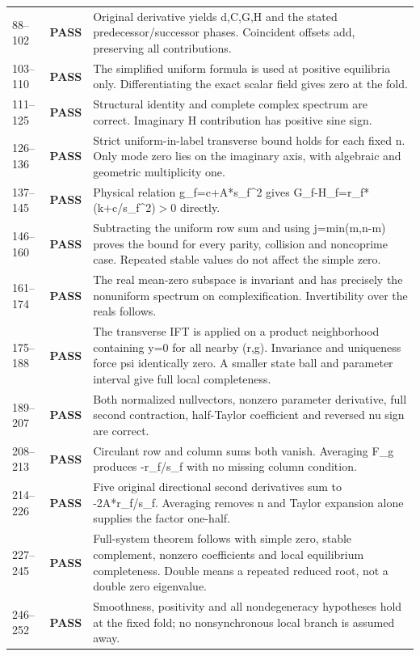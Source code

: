 \documentclass[11pt]{article}
\newcommand{\pass}{\textbf{PASS}}
\begin{document}
\begin{longtable}{@{}p{}p{}p{}@{}}
88--102 & \pass & Original derivative yields d,C,G,H and the stated predecessor/successor phases. Coincident offsets add, preserving all contributions.\\
103--110 & \pass & The simplified uniform formula is used at positive equilibria only. Differentiating the exact scalar field gives zero at the fold.\\
111--125 & \pass & Structural identity and complete complex spectrum are correct. Imaginary H contribution has positive sine sign.\\
126--136 & \pass & Strict uniform-in-label transverse bound holds for each fixed n. Only mode zero lies on the imaginary axis, with algebraic and geometric multiplicity one.\\
137--145 & \pass & Physical relation g\_f=c+A*s\_f\textasciicircum{}2 gives G\_f-H\_f=r\_f*(k+c/s\_f\textasciicircum{}2)\ensuremath{>}0 directly.\\
146--160 & \pass & Subtracting the uniform row sum and using j=min(m,n-m) proves the bound for every parity, collision and noncoprime case. Repeated stable values do not affect the simple zero.\\
161--174 & \pass & The real mean-zero subspace is invariant and has precisely the nonuniform spectrum on complexification. Invertibility over the reals follows.\\
175--188 & \pass & The transverse IFT is applied on a product neighborhood containing y=0 for all nearby (r,g). Invariance and uniqueness force psi identically zero. A smaller state ball and parameter interval give full local completeness.\\
189--207 & \pass & Both normalized nullvectors, nonzero parameter derivative, full second contraction, half-Taylor coefficient and reversed nu sign are correct.\\
208--213 & \pass & Circulant row and column sums both vanish. Averaging F\_g produces -r\_f/s\_f with no missing column condition.\\
214--226 & \pass & Five original directional second derivatives sum to -2A*r\_f/s\_f. Averaging removes n and Taylor expansion alone supplies the factor one-half.\\
227--245 & \pass & Full-system theorem follows with simple zero, stable complement, nonzero coefficients and local equilibrium completeness. Double means a repeated reduced root, not a double zero eigenvalue.\\
246--252 & \pass & Smoothness, positivity and all nondegeneracy hypotheses hold at the fixed fold; no nonsynchronous local branch is assumed away.\\

\end{longtable}
\end{document}
